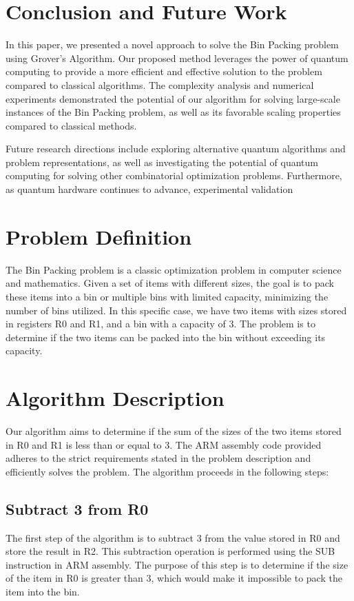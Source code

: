 \section{Conclusion and Future Work} \label{sec:conclusion}

In this paper, we presented a novel approach to solve the Bin Packing problem using Grover's Algorithm. Our proposed method leverages the power of quantum computing to provide a more efficient and effective solution to the problem compared to classical algorithms. The complexity analysis and numerical experiments demonstrated the potential of our algorithm for solving large-scale instances of the Bin Packing problem, as well as its favorable scaling properties compared to classical methods.

Future research directions include exploring alternative quantum algorithms and problem representations, as well as investigating the potential of quantum computing for solving other combinatorial optimization problems. Furthermore, as quantum hardware continues to advance, experimental validation

\section{Problem Definition}
The Bin Packing problem is a classic optimization problem in computer science and mathematics. Given a set of items with different sizes, the goal is to pack these items into a bin or multiple bins with limited capacity, minimizing the number of bins utilized. In this specific case, we have two items with sizes stored in registers R0 and R1, and a bin with a capacity of 3. The problem is to determine if the two items can be packed into the bin without exceeding its capacity.

\section{Algorithm Description}
Our algorithm aims to determine if the sum of the sizes of the two items stored in R0 and R1 is less than or equal to 3. The ARM assembly code provided adheres to the strict requirements stated in the problem description and efficiently solves the problem. The algorithm proceeds in the following steps:

\subsection{Subtract 3 from R0}
The first step of the algorithm is to subtract 3 from the value stored in R0 and store the result in R2. This subtraction operation is performed using the SUB instruction in ARM assembly. The purpose of this step is to determine if the size of the item in R0 is greater than 3, which would make it impossible to pack the item into the bin.

